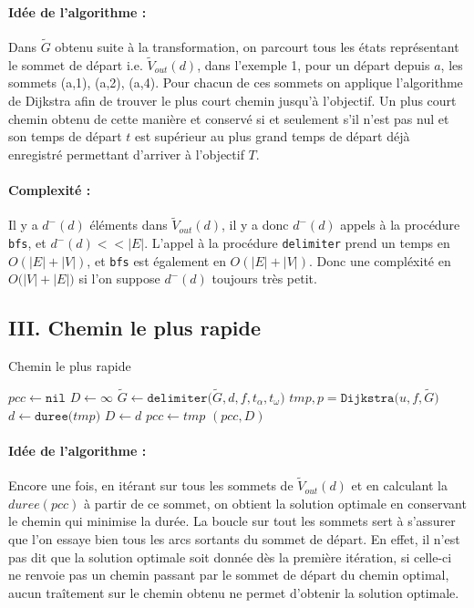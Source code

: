 \documentclass{article}
\begin{document}
\paragraph{Idée de l'algorithme : } Dans $\tilde{G}$ obtenu suite à la
transformation, on parcourt tous les états représentant le sommet de départ i.e.
$\tilde{V}_{out}(d)$, dans l'exemple 1, pour un départ depuis $a$, les sommets
(a,1), (a,2), (a,4). Pour chacun de ces sommets on applique l'algorithme de
Dijkstra afin de trouver le plus court chemin jusqu'à l'objectif. Un plus court
chemin obtenu de cette manière et conservé si et seulement s'il n'est pas nul et
son temps de départ $t$ est supérieur au plus grand temps de départ déjà
enregistré permettant d'arriver à l'objectif $T$.

\paragraph{Complexité : } Il y a $d^-(d)$ éléments dans $\tilde{V}_{out}(d)$, il
y a donc $d^-(d)$ appels à la procédure \texttt{bfs}, et $d^-(d) << |E|$. L'appel à la
procédure \texttt{delimiter} prend un temps en $O(|E|+|V|)$, et \texttt{bfs} est
également en $O(|E|+|V|)$. Donc une compléxité en
$O\big(|V|+|E|\big)$ si l'on suppose $d^-(d)$ toujours très petit.

\subsection*{III. Chemin le plus rapide}
\begin{algorithm}
\caption{Chemin le plus rapide}
\begin{algorithmic}[1]
    \State $pcc \leftarrow \texttt{nil}$ 
    \State $D \leftarrow \infty$ 
    \State $\tilde{G} \leftarrow \texttt{delimiter($\tilde{G}, d, f, t_\alpha, t_\omega$)}$
        \State $tmp, p = \texttt{Dijkstra($u,f,\tilde{G}$)}$
        \State $d \leftarrow \texttt{duree($tmp$)}$
            \State $D \leftarrow d$
            \State $pcc \leftarrow tmp$
        \EndIf
    \EndFor
    \State \Return $(pcc, D)$
\EndProcedure
\end{algorithmic}
\end{algorithm}
\paragraph{Idée de l'algorithme : } Encore une fois, en itérant sur tous les
sommets de $\tilde{V}_{out}(d)$ et en calculant la $duree(pcc)$ à partir de ce
sommet, on obtient la solution optimale en conservant le chemin qui minimise la
durée. La boucle sur tout les sommets sert à s'assurer que l'on essaye bien tous
les arcs sortants du sommet de départ. En effet, il n'est pas dit que la
solution optimale soit donnée dès la première itération, si celle-ci ne renvoie
pas un chemin passant par le sommet de départ du chemin optimal, aucun
traîtement sur le chemin obtenu ne permet d'obtenir la solution optimale.
\end{document}
